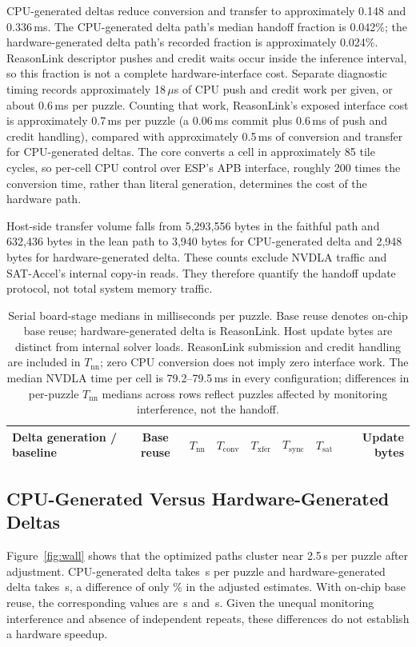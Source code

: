 CPU-generated deltas reduce conversion and transfer to approximately 0.148 and 0.336\,ms. The CPU-generated delta path's median handoff fraction is 0.042\%; the hardware-generated delta path's recorded fraction is approximately 0.024\%. ReasonLink descriptor pushes and credit waits occur inside the inference interval, so this fraction is not a complete hardware-interface cost. Separate diagnostic timing records approximately 18\,$\mu$s of CPU push and credit work per given, or about 0.6\,ms per puzzle. Counting that work, ReasonLink's exposed interface cost is approximately 0.7\,ms per puzzle (a 0.06\,ms commit plus 0.6\,ms of push and credit handling), compared with approximately 0.5\,ms of conversion and transfer for CPU-generated deltas. The core converts a cell in approximately 85 tile cycles, so per-cell CPU control over ESP's APB interface, roughly 200 times the conversion time, rather than literal generation, determines the cost of the hardware path.

Host-side transfer volume falls from 5,293,556 bytes in the faithful path and 632,436 bytes in the lean path to 3,940 bytes for CPU-generated delta and 2,948 bytes for hardware-generated delta. These counts exclude NVDLA traffic and SAT-Accel's internal copy-in reads. They therefore quantify the handoff update protocol, not total system memory traffic.

\begin{table}[t]
\centering
\caption{Serial board-stage medians in milliseconds per puzzle. Base reuse denotes on-chip base reuse; hardware-generated delta is ReasonLink. Host update bytes are distinct from internal solver loads. ReasonLink submission and credit handling are included in $T_{\mathrm{nn}}$; zero CPU conversion does not imply zero interface work. The median NVDLA time per cell is 79.2--79.5\,ms in every configuration; differences in per-puzzle $T_{\mathrm{nn}}$ medians across rows reflect puzzles affected by monitoring interference, not the handoff.}
\label{tab:serial}
\small
\begin{tabular}{@{}lcrrrrrr@{}}
\toprule
Delta generation / baseline & Base reuse & $T_{\mathrm{nn}}$ & $T_{\mathrm{conv}}$ & $T_{\mathrm{xfer}}$ & $T_{\mathrm{sync}}$ & $T_{\mathrm{sat}}$ & Update bytes\\
\midrule

\end{tabular}
\end{table}

\subsection{CPU-Generated Versus Hardware-Generated Deltas}
Figure~\ref{fig:wall} shows that the optimized paths cluster near 2.5\,s per puzzle after adjustment. CPU-generated delta takes \SerialDeltaAdjusted\,s per puzzle and hardware-generated delta takes \SerialRLAdjusted\,s, a difference of only \DeltaRLDifference\% in the adjusted estimates. With on-chip base reuse, the corresponding values are \SerialDeltaResidentAdjusted\,s and \SerialRLResidentAdjusted\,s. Given the unequal monitoring interference and absence of independent repeats, these differences do not establish a hardware speedup.

